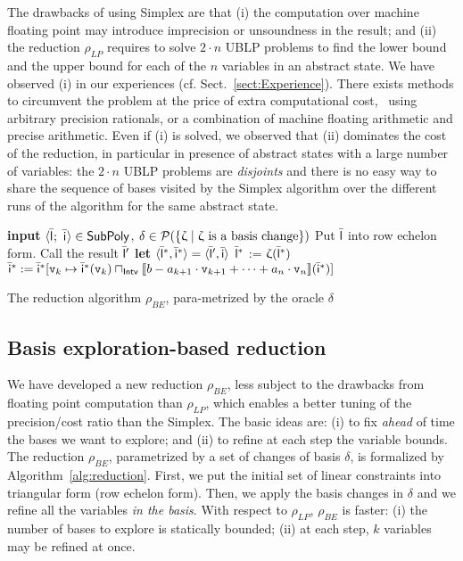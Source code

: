\documentclass[sttt]{svjour}
\begin{document}
The drawbacks of using Simplex are that (i) the computation over machine floating point  may introduce imprecision or unsoundness in the result; and (ii) the reduction $\rho_{LP}$ requires to solve $2 \cdot n$ UBLP problems to find the lower bound and the upper bound for each of the $n$ variables in an abstract state.
We have observed (i) in our experiences (cf. Sect.~\ref{sect:Experience}). 
There exists methods to circumvent the problem at the price of extra computational cost, \eg\ using arbitrary precision rationals, or a combination of machine floating arithmetic and precise arithmetic.
Even if (i) is solved, we observed that (ii) dominates the cost of the reduction, in particular in presence of abstract states with a large number of variables: the $2 \cdot n$ UBLP problems are \emph{disjoints} and there is no easy way to share the sequence of bases visited by the Simplex algorithm over the different runs of the algorithm for the same abstract state.

\begin{algorithm}[t]
\begin{algorithmic}
\STATE \textbf{input} $\langle \bar{\mathsf{\mathsf{l}}}_{}^{};\ \bar{\mathsf{\mathsf{i}}}_{}^{} \rangle \in \mathsf{SubPoly}$, $\delta \in \mathcal{P}{(\{ \upzeta \mid \upzeta\ \text{is a basis change}\})} $
\medskip
\STATE Put $\bar{\mathsf{\mathsf{l}}}$ into row echelon form. Call the result $\bar{\mathsf{\mathsf{l}}}'$
\STATE \textbf{let} $\langle \bar{\mathsf{\mathsf{l}}}^*, \bar{\mathsf{\mathsf{i}}}^* \rangle =  \langle \bar{\mathsf{\mathsf{l}}}', \bar{\mathsf{\mathsf{i}}} \rangle$
\FORALL{$\upzeta \in \delta$}
 \STATE $\bar{\mathsf{\mathsf{l}}}^*$ := $\upzeta(\bar{\mathsf{\mathsf{l}}}^*)$
 \STATE $\bar{\mathsf{\mathsf{i}}}^* := \bar{\mathsf{\mathsf{i}}}^*[\mathtt{v}_k \mapsto \bar{\mathsf{\mathsf{i}}}^*(\mathtt{v}_k) \sqcap_{\mathsf{Intv}} \llbracket b-a_{k+1}\cdot \mathtt{v}_{k+1} + \dots + a_n\cdot \mathtt{v}_{n}\rrbracket(\bar{\mathsf{\mathsf{i}}}^*)]$  
 \ENDFOR
\ENDFOR
\smallskip
\RETURN \tupla{\lineq^*, \intv^*}
\end{algorithmic}
\caption{The reduction algorithm $\rho_{BE}$, para-metrized by the oracle $\delta$}
\label{alg:reduction}
\end{algorithm}

\subsection{Basis exploration-based reduction}
We have developed a new reduction  $\rho_{BE}$,  less subject to the drawbacks from floating point computation than $\rho_{LP}$,  which enables a better tuning of the precision/cost ratio than the Simplex. 
The basic ideas are: (i) to fix \emph{ahead} of time the bases we want to explore; and (ii) to refine at each step the variable bounds.
The reduction $\rho_{BE}$, parametrized by a set of changes of basis $\delta$, is formalized by Algorithm~\ref{alg:reduction}. 
First, we put the initial set of linear constraints into triangular form (row echelon form). 
Then, we apply the basis changes in $\delta$ and we refine all the variables \emph{in the basis}.
With respect to $\rho_{LP}$, $\rho_{BE}$ is faster: (i) the number of bases to explore is statically bounded; (ii) at each step, $k$ variables may be refined at once. 
\end{document}
